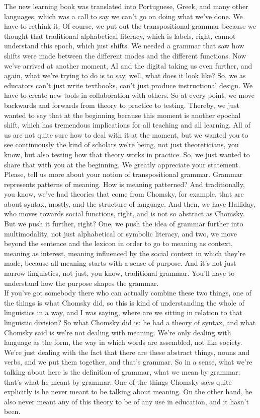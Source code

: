 \documentclass[english]{textolivre}
\begin{document}
{    The new learning book was translated into Portuguese, Greek, and many other languages, which was a call to say we can’t go on doing what we’ve done. We have to rethink it. Of course, we put out the transpositional grammar because we thought that traditional alphabetical literacy, which is labels, right, cannot understand this epoch, which just shifts. We needed a grammar that saw how shifts were made between the different modes and the different functions. Now we’ve arrived at another moment, AI and the digital taking us even further, and again, what we’re trying to do is to say, well, what does it look like? So, we as educators can’t just write textbooks, can’t just produce instructional design. We have to create new tools in collaboration with others. So at every point, we move backwards and forwards from theory to practice to testing. Thereby, we just wanted to say that at the beginning because this moment is another epochal shift, which has tremendous implications for all teaching and all learning. All of us are not quite sure how to deal with it at the moment, but we wanted you to see continuously the kind of scholars we’re being, not just theoreticians, you know, but also testing how that theory works in practice. So, we just wanted to share that with you at the beginning.
    \Qu We greatly appreciate your statement. Please, tell us more about your notion of transpositional grammar.
    \An Grammar represents patterns of meaning. How is meaning patterned? And traditionally, you know, we’ve had theories that come from Chomsky, for example, that are about syntax, mostly, and the structure of language. And then, we have Halliday, who moves towards social functions, right, and is not so abstract as Chomsky. But we push it further, right? One, we push the idea of grammar further into multimodality, not just alphabetical or symbolic literacy, and two, we move beyond the sentence and the lexicon in order to go to meaning as context, meaning as interest, meaning influenced by the social context in which they’re made, because all meaning starts with a sense of purpose. And it’s not just narrow linguistics, not just, you know, traditional grammar. You’ll have to understand how the purpose shapes the  grammar. \\
    If you’ve got somebody there who can actually combine these two things, one of the things is what Chomsky did, so this is kind of understanding the whole of linguistics in a way, and I was saying, where are we sitting in relation to that linguistic division? So what Chomsky did is: he had a theory of syntax, and what Chomsky said is we’re not dealing with meaning. We’re only dealing with language as the form, the way in which words are assembled, not like society. We’re just dealing with the fact that there are these abstract things, nouns and verbs, and we put them together, and that’s grammar. So in a sense, what we’re talking about here is the definition of grammar, what we mean by grammar; that’s what he meant by grammar. One of the things Chomsky says quite explicitly is he never meant to be talking about meaning. On the other hand, he also never meant any of this theory to be of any use in education, and it hasn’t been.\\
}
\end{document}

